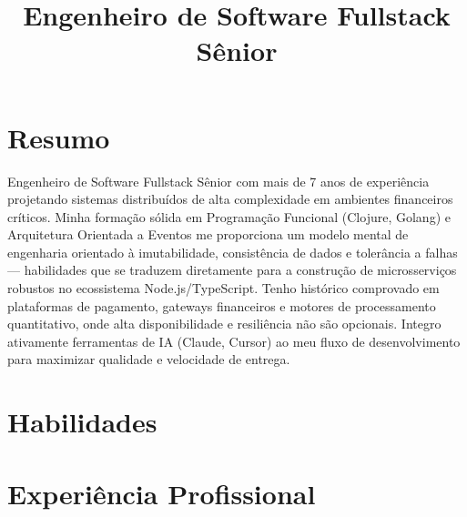 \documentclass[10pt,a4paper,sans]{moderncv}
\title{Engenheiro de Software Fullstack Sênior}
\begin{document}
\makecvtitle

\section{Resumo}
Engenheiro de Software Fullstack Sênior com mais de 7 anos de experiência projetando sistemas distribuídos de alta complexidade em ambientes financeiros críticos. Minha formação sólida em Programação Funcional (Clojure, Golang) e Arquitetura Orientada a Eventos me proporciona um modelo mental de engenharia orientado à imutabilidade, consistência de dados e tolerância a falhas --- habilidades que se traduzem diretamente para a construção de microsserviços robustos no ecossistema Node.js/TypeScript. Tenho histórico comprovado em plataformas de pagamento, gateways financeiros e motores de processamento quantitativo, onde alta disponibilidade e resiliência não são opcionais. Integro ativamente ferramentas de IA (Claude, Cursor) ao meu fluxo de desenvolvimento para maximizar qualidade e velocidade de entrega.

\section{Habilidades}

\section{Experiência Profissional}
\end{document}
